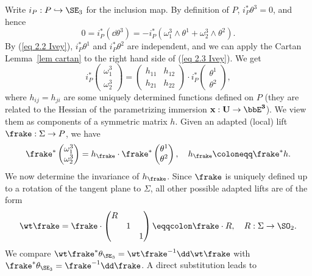 Write $i_P:P\hookrightarrow \SE_3$ for the inclusion map. By definition of $P$, $i_P^\ast\theta^3=0$, and hence 
\[0=i_P^\ast(\dd\theta^3)=-i_P^\ast(\omega_1^3\wedge\theta^1+\omega_2^3\wedge\theta^2).\label{eq 2.3 Ivey}\]
By (\ref{eq 2.2 Ivey}), $i_P^\ast\theta^1$ and $i_P^\ast\theta^2$ are independent, and we can apply the Cartan Lemma~\ref{lem cartan} to the right hand side of (\ref{eq 2.3 Ivey}). We get 
\[i_P^\ast 
\begin{pmatrix}
    \omega_1^3 \\ \omega_2^3
\end{pmatrix}
=
\begin{pmatrix}
    h_{11} & h_{12}\\ h_{21} & h_{22}
\end{pmatrix}\cdot
i_P^\ast 
\begin{pmatrix}
    \theta^1 \\ \theta^2
\end{pmatrix},\label{def h}
\]
where $h_{ij}=h_{ji}$ are some uniquely determined functions defined on $P$ (they are related to the Hessian of the parametrizing immersion $\bf{x}:U\to \bbE^3$). We view them as components of a symmetric matrix $h$. Given an adapted (local) lift $\frake:\Sigma\to P$, we have 
\[\frake^\ast \begin{pmatrix}
    \omega_1^3 \\ \omega_2^3
\end{pmatrix}=
h_\frake \cdot \frake^\ast \begin{pmatrix}
    \theta^1 \\ \theta^2
\end{pmatrix},\quad h_\frake\coloneqq \frake^\ast h.
\]
We now determine the invariance of $h_\frake$. Since $\frake$ is uniquely defined up to a rotation of the tangent plane to $\Sigma$, all other possible adapted lifts are of the form
\[\wt\frake=\frake\cdot\begin{pmatrix}
    R &&\\
    &1 &\\
    &&1
\end{pmatrix}\eqqcolon \frake\cdot R,\quad R:\Sigma\to \SO_2.
\]
We compare $\wt\frake^\ast \theta_{\SE_3}=\wt\frake^{-1}\dd \wt\frake$ with $\frake^\ast\theta_{\SE_3}=\frake^{-1}\dd\frake$. A direct substitution leads to 
